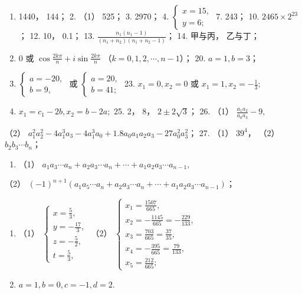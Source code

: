 \begin{enumerate}
\item
  1440， 144； 2. （1） 525； 3. 2970； 4.
  \(\left\{ \begin{array}{l} x = 15, \\ y = 6; \end{array} \right.\) 7.
  243； 10. \(2465 \times 2^{23}\)； 12. 10， 0.1； 13.
  \(\frac{n_1(n_1 - 1)}{(n_1 + n_2)(n_1 + n_2 - 1)}\)； 14. 甲与丙，
  乙与丁；
\item
  0 或 \(\cos \frac{2k\pi}{n} + i\sin \frac{2k\pi}{n}\)
  （\(k = 0, 1, 2, \cdots, n-1\)）； 20. \(a = 1, b = 3\)；
\item
  \(\left\{ \begin{array}{l}a = -20,\\ b = 9, \end{array} \right.\) 或
  \(\left\{ \begin{array}{l}a = 20,\\ b = 41; \end{array} \right.\) 23.
  \(x_{1} = 0,x_{2} = 0\) 或 \(x_{1} = 1,x_{2} = -\frac{1}{3};\)
\item
  \(x_{1} = c_{1} - 2b, x_{2} = b - 2a;\) 25. 2， 8，
  \(2 \pm 2\sqrt{3}\)； 26. （1） \(\frac{a_1a_2}{a_0a_3} - 9,\)
\end{enumerate}

（2）
\(a_1^2 a_2^2 - 4a_1^3 a_3 - 4a_1^3 a_0 + 1.8a_0a_1a_2a_3 - 27a_0^2 a_3^2\)；
27. （1） \(39^4\)， （2） \(b_2b_3\cdots b_n\)；

\begin{enumerate}[start=28]
\item
  （1）
  \(a_{1}a_{3}\cdots a_{n} + a_{2}a_{3}\cdots a_{n} + \cdots + a_{1}a_{2}a_{3}\cdots a_{n-1},\)
\end{enumerate}

（2）
\((-1)^{n+1}(a_1a_5\cdots a_n + a_2a_3\cdots a_n + \cdots + a_1a_2a_3\cdots a_{n-1})\)；

\begin{enumerate}[start=29]
\item
  （1）
  \(\left\{ \begin{array}{l} x = \frac{5}{3}, \\ y = -\frac{17}{3}, \\ z = -\frac{5}{2}, \\ t = \frac{5}{3}, \end{array} \right.\)
  （2）
  \(\left\{ \begin{array}{l} x_1 = \frac{1507}{665}, \\ x_2 = -\frac{1145}{665} = -\frac{229}{133}, \\ x_3 = \frac{703}{665} = \frac{37}{35}, \\ x_4 = -\frac{395}{665} = \frac{79}{133}, \\ x_5 = \frac{212}{665}; \end{array} \right.\)
\item
  \(a = 1, b = 0, c = -1, d = 2.\)
\end{enumerate}

